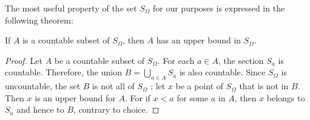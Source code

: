 The most useful property of the set \(S_{\Omega }\) for our purposes 
is expressed in the following theorem:

\begin{theorem}
\label{thm:\thetheorem}
 If \(A\) is a countable subset of \(S_{\Omega }\), then \(A\) has an upper bound in \(S_{\Omega }\).
\end{theorem}

\begin{proof}
 Let \(A\) be a countable subset of \(S_{\Omega }\). For each \(a \in A\), the section \(S_{a}\) is countable. Therefore, the union \(B = \mathop{\bigcup }\limits_{{a \in A}}S_{a}\) is also countable. Since \(S_{\Omega }\) is uncountable, the set \(B\) is not all of \(S_{\Omega }\) ; let \(x\) be a point of \(S_{\Omega }\) that is not in \(B\). Then \(x\) is an upper bound for \(A\). For if \(x < a\) for some \(a\) in \(A\), then \(x\) belongs to \(S_{a}\) and hence to \(B\), contrary to choice.
\end{proof}

